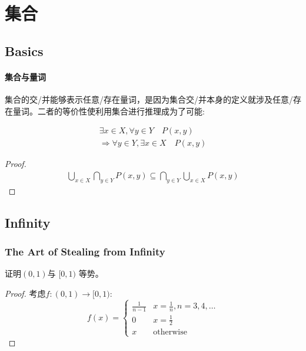\chapter{集合}
\section{Basics}

\subsubsection{集合与量词}

集合的交/并能够表示任意/存在量词，是因为集合交/并本身的定义就涉及任意/存在量词。二者的等价性使利用集合进行推理成为了可能:

\begin{theorem}
    \begin{align*}
        \exists x \in X, \forall y \in Y \quad P(x,y) \\
        \Rightarrow \forall y \in Y, \exists x \in X \quad P(x,y)
    \end{align*}
\end{theorem}

\begin{proof}
    \begin{align*}
        \bigcup_{x \in X} \bigcap_{y \in Y} P(x,y) \subseteq
        \bigcap_{y \in Y} \bigcup_{x \in X} P(x,y)
    \end{align*}
\end{proof}

\section{Infinity}
\subsection{The Art of Stealing from Infinity}

\begin{problem}
    证明\((0,1)\)与 \([0,1)\) 等势。
\end{problem}

\begin{proof}
    考虑\(f:(0,1) \to [0,1)\):\[
        f(x) =
        \begin{cases}
            \frac{1}{n-1} & x =\frac{1}{n}, n=3,4,\dots  \\
            0 & x=\frac{1}{2} \\
            x & \text{otherwise}
        \end{cases}
    \]
\end{proof}

